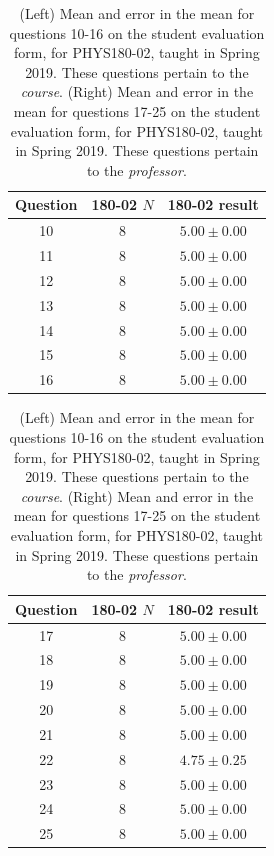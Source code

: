 \documentclass[../../main.tex]{subfiles}
\begin{document}
\begin{table}[ht]
\small
\centering
\begin{tabular}{| c | c | c |}
\hline \hline
Question & 180-02 $N$ & 180-02 result \\ \hline
10 & 8 & $5.00\pm 0.00$ \\ \hline
11 & 8 & $5.00\pm 0.00$ \\ \hline
12 & 8 & $5.00\pm 0.00$ \\ \hline
13 & 8 & $5.00\pm 0.00$ \\ \hline
14 & 8 & $5.00\pm 0.00$ \\ \hline
15 & 8 & $5.00\pm 0.00$ \\ \hline
16 & 8 & $5.00\pm 0.00$ \\ \hline
\hline
\end{tabular}
\quad
\begin{tabular}{| c | c | c |}
\hline \hline
Question & 180-02 $N$ & 180-02 result \\ \hline
17 & 8 & $5.00\pm 0.00$ \\ \hline
18 & 8 & $5.00\pm 0.00$ \\ \hline
19 & 8 & $5.00\pm 0.00$ \\ \hline
20 & 8 & $5.00\pm 0.00$ \\ \hline
21 & 8 & $5.00\pm 0.00$ \\ \hline
22 & 8 & $4.75\pm 0.25$ \\ \hline
23 & 8 & $5.00\pm 0.00$ \\ \hline
24 & 8 & $5.00\pm 0.00$ \\ \hline
25 & 8 & $5.00\pm 0.00$ \\ \hline
\hline
\end{tabular}
\caption{\label{tab:courses:intro_eval_3} (Left) Mean and error in the mean for questions 10-16 on the student evaluation form, for PHYS180-02, taught in Spring 2019.  These questions pertain to the \textit{course}.  (Right) Mean and error in the mean for questions 17-25 on the student evaluation form, for PHYS180-02, taught in Spring 2019.  These questions pertain to the \textit{professor}.}
\end{table}
\end{document}
